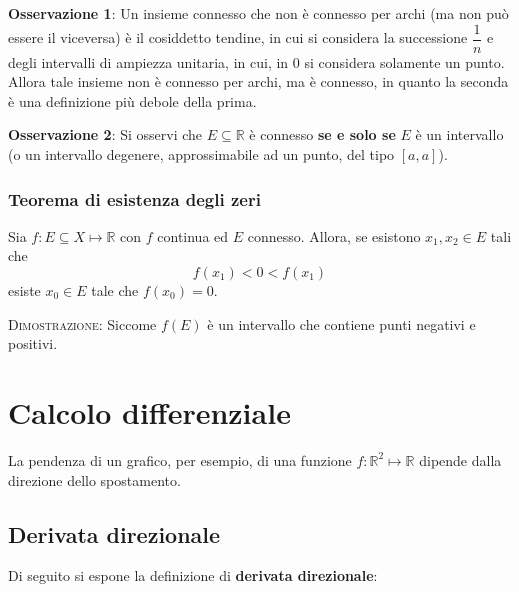 \documentclass[a4paper]{extarticle}
\begin{document}
\vspace{1em}
\noindent
\textbf{Osservazione 1}: Un insieme connesso che non è connesso per archi (ma non può essere il viceversa) è il cosiddetto tendine, in cui si considera la successione $\dfrac{1}{n}$ e degli intervalli di ampiezza unitaria, in cui, in $0$ si considera solamente un punto.\\ Allora tale insieme non è connesso per archi, ma è connesso, in quanto la seconda è una definizione più debole della prima.

\vspace{1em}
\noindent
\textbf{Osservazione 2}: Si osservi che $E \subseteq \mathbb{R}$ è connesso \textbf{se e solo se} $E$ è un intervallo (o un intervallo degenere, approssimabile ad un punto, del tipo $[a,a]$).

\vspace{1em}
\noindent
\subsubsection{Teorema di esistenza degli zeri}
Sia $f : E \subseteq X \longmapsto \mathbb{R}$ con $f$ continua ed $E$ connesso. Allora, se esistono $x_1,x_2 \in E$ tali che
\[f(x_1) < 0 < f(x_1)\]
esiste $x_0 \in E$ tale che $f(x_0)=0$.

\vspace{2em}
\noindent
\normalfont \normalsize
\textsc{Dimostrazione}: Siccome $f(E)$ è un intervallo che contiene punti negativi e positivi.

\newpage
\noindent
\section{Calcolo differenziale}
La pendenza di un grafico, per esempio, di una funzione $f : \mathbb{R}^2 \longmapsto \mathbb{R}$ dipende dalla direzione dello spostamento.

\vspace{1em}
\noindent
\subsection{Derivata direzionale}
Di seguito si espone la definizione di \textbf{derivata direzionale}:
\end{document}
